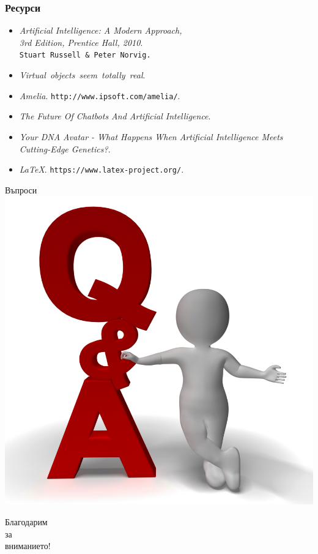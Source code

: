 \documentclass[12pt]{beamer}
\begin{document}
	\begin{frame}
	\frametitle{Ресурси}
		\begin{itemize}
			\item
			{\itshape Artificial Intelligence: A Modern Approach, \\ 3rd Edition, Prentice Hall, 2010}. \\
			\texttt{Stuart Russell \& Peter Norvig.} \\
			\item
			{\itshape Virtual\ objects\ seem\ totally\ real}.
			\\
			\item
			{\itshape Amelia}.
			\texttt{http://www.ipsoft.com/amelia/}. \\
			\item
			{\itshape The Future Of Chatbots And Artificial Intelligence}.
			\item
			{\itshape Your DNA Avatar - What Happens When Artificial Intelligence Meets Cutting-Edge Genetics?}.
			\item%
			{\itshape \LaTeX}.
			\texttt{https://www.latex-project.org/}.
		\end{itemize}
	\end{frame}
	
	\begin{frame}
	\begin{center}
	{\Huge Въпроси}\\
	\includegraphics[scale=0.25]{../questions.png}
	\end{center}
	\end{frame}
	
	\begin{frame}
	\begin{center}
	{\Huge Благодарим\\за\\вниманието!}
	\end{center}
	\end{frame}
\end{document}
